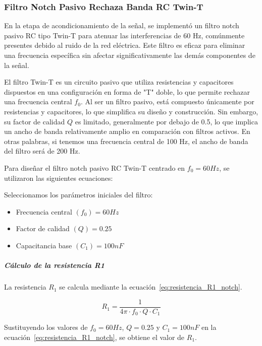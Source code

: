         \subsubsection{Filtro Notch Pasivo Rechaza Banda RC Twin-T}
                En la etapa de acondicionamiento de la señal, se implementó un filtro notch pasivo RC tipo Twin-T para atenuar las interferencias de 60 Hz, comúnmente presentes debido al ruido de la red eléctrica. Este filtro es eficaz para eliminar una frecuencia específica sin afectar significativamente las demás componentes de la señal.

                El filtro Twin-T es un circuito pasivo que utiliza resistencias y capacitores dispuestos en una configuración en forma de "T" doble, lo que permite rechazar una frecuencia central $f_0$. Al ser un filtro pasivo, está compuesto únicamente por resistencias y capacitores, lo que simplifica su diseño y construcción. Sin embargo, su factor de calidad $Q$ es limitado, generalmente por debajo de 0.5, lo que implica un ancho de banda relativamente amplio en comparación con filtros activos. En otras palabras, si tenemos una frecuencia central de 100 Hz, el ancho de banda del filtro será de 200 Hz.

                Para diseñar el filtro notch pasivo RC Twin-T centrado en $f_0 = 60 Hz$, se utilizaron las siguientes ecuaciones:

                Seleccionamos los parámetros iniciales del filtro:
                \begin{itemize}
                    \item Frecuencia central $(f_0) = 60 Hz$
                    \item Factor de calidad $(Q) = 0.25$
                    \item Capacitancia base $(C_1) = 100 nF$
                \end{itemize}

                \subparagraph{Cálculo de la resistencia R1}
                    La resistencia $R_1$ se calcula mediante la ecuación~\ref{eq:resistencia_R1_notch}.

                    \begin{equation}
                        \label{eq:resistencia_R1_notch}
                        R_1 = \frac{1}{4\pi \cdot f_0 \cdot Q \cdot C_1}
                    \end{equation}

                    Sustituyendo los valores de $f_0 = 60 Hz$, $Q = 0.25$ y $C_1 = 100 nF$ en la ecuación~\ref{eq:resistencia_R1_notch}, se obtiene el valor de $R_1$.

